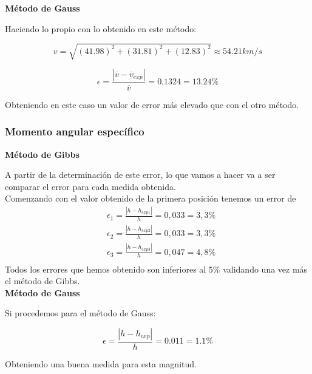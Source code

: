 \documentclass{article}
\numberwithin{equation}{section}
\begin{document}
\noindent\textbf{Método de Gauss}\par
Haciendo lo propio con lo obtenido en este método:

\begin{equation*}
    v=\sqrt{(41.98)^2+(31.81)^2+(12.83)^2}\approx54.21 km/s
\end{equation*}

\begin{equation*}
    \epsilon=\frac{\left\lvert \overline{v}-\overline{v}_{exp} \right\rvert }{\overline{v}}=0.1324=13.24\%
\end{equation*}

Obteniendo en este caso un valor de error más elevado que con el otro método.

\subsubsection{Momento angular específico}
\noindent\textbf{Método de Gibbs}\par
A partir de la determinación de este error, lo que vamos a 
hacer va a ser comparar el error para cada medida obtenida. \\

Comenzando con el valor obtenido de la primera posición tenemos 
un error de 
\begin{align*}
    &\epsilon_{1}=\frac{\left\lvert h-h_{exp1} \right\rvert }{h}=0,033=3,3\% \\
    &\epsilon_{2}=\frac{\left\lvert h-h_{exp2} \right\rvert }{h}=0,033=3,3\% \\
    &\epsilon_{3}=\frac{\left\lvert h-h_{exp3} \right\rvert }{h}=0,047=4,8\% \\
\end{align*}
Todos los errores que hemos obtenido son inferiores al $5\%$ 
validando una vez más el método de Gibbs.\\

\noindent\textbf{Método de Gauss}\par
Si procedemos para el método de Gauss:

\begin{equation*}
    \epsilon=\frac{\left\lvert h-h_{exp} \right\rvert}{h}=0.011=1.1\%
\end{equation*}

Obteniendo una buena medida para esta magnitud.
\end{document}
